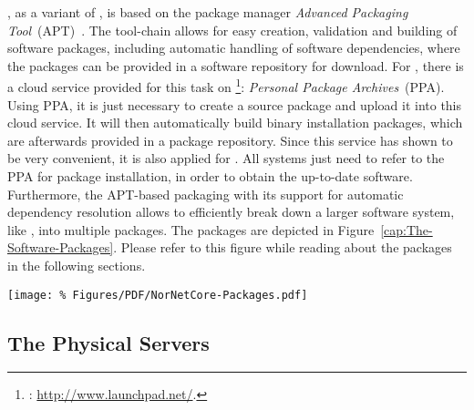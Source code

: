 , as a variant of , is based on the package manager \emph{Advanced Packaging Tool}~(APT)~\cite{DebianDevelopersReference}. The  tool-chain allows for easy creation, validation and building of software packages, including automatic handling of software dependencies, where the packages can be provided in a software repository for download. For , there is a cloud service provided for this task on \footnote{: \url{http://www.launchpad.net/}.}: \emph{Personal Package Archives}~(PPA). Using PPA, it is just necessary to create a source package and upload it into this cloud service. It will then automatically build binary installation packages, which are afterwards provided in a package repository. Since this service has shown to be very convenient, it is also applied for . All  systems just need to refer to the PPA for package installation, in order to obtain the up-to-date  software.
Furthermore, the APT-based packaging with its support for automatic dependency resolution allows to efficiently break down a larger software system, like , into multiple packages. The  packages are depicted in Figure~\ref{cap:The-Software-Packages}. Please refer to this figure while reading about the packages in the following sections.

\begin{figure*}
\begin{center}
\texttt{[image: \%
   Figures/PDF/NorNetCore-Packages.pdf]}
\end{center}
\caption{The Software Packages}
\label{cap:The-Software-Packages}
\end{figure*}


\subsection{The Physical Servers}


